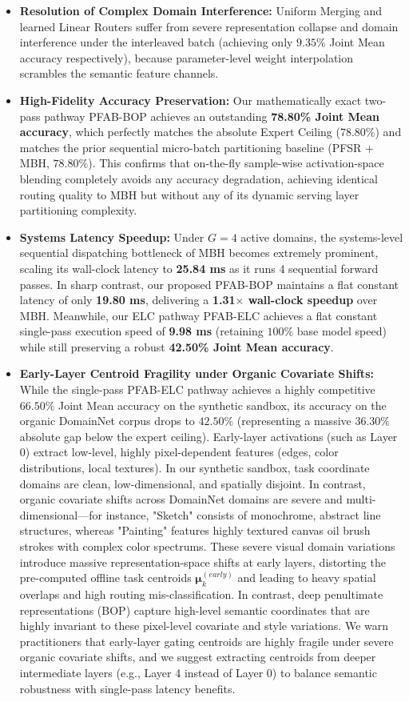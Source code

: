 \begin{itemize}
  \item \textbf{Resolution of Complex Domain Interference:} Uniform Merging and learned Linear Routers suffer from severe representation collapse and domain interference under the interleaved batch (achieving only $9.35\%$ Joint Mean accuracy respectively), because parameter-level weight interpolation scrambles the semantic feature channels.
  \item \textbf{High-Fidelity Accuracy Preservation:} Our mathematically exact two-pass pathway \textsc{PFAB-BOP} achieves an outstanding \textbf{78.80\% Joint Mean accuracy}, which perfectly matches the absolute Expert Ceiling ($78.80\%$) and matches the prior sequential micro-batch partitioning baseline (\textsc{PFSR} + \textsc{MBH}, $78.80\%$). This confirms that on-the-fly sample-wise activation-space blending completely avoids any accuracy degradation, achieving identical routing quality to MBH but without any of its dynamic serving layer partitioning complexity.
  \item \textbf{Systems Latency Speedup:} Under $G=4$ active domains, the systems-level sequential dispatching bottleneck of MBH becomes extremely prominent, scaling its wall-clock latency to \textbf{25.84 ms} as it runs 4 sequential forward passes. In sharp contrast, our proposed \textsc{PFAB-BOP} maintains a flat constant latency of only \textbf{19.80 ms}, delivering a \textbf{1.31$\times$ wall-clock speedup} over MBH. Meanwhile, our ELC pathway \textsc{PFAB-ELC} achieves a flat constant single-pass execution speed of \textbf{9.98 ms} (retaining $100\%$ base model speed) while still preserving a robust \textbf{42.50\% Joint Mean accuracy}.
  \item \textbf{Early-Layer Centroid Fragility under Organic Covariate Shifts:} While the single-pass \textsc{PFAB-ELC} pathway achieves a highly competitive $66.50\%$ Joint Mean accuracy on the synthetic sandbox, its accuracy on the organic DomainNet corpus drops to $42.50\%$ (representing a massive $36.30\%$ absolute gap below the expert ceiling). Early-layer activations (such as Layer 0) extract low-level, highly pixel-dependent features (edges, color distributions, local textures). In our synthetic sandbox, task coordinate domains are clean, low-dimensional, and spatially disjoint. In contrast, organic covariate shifts across DomainNet domains are severe and multi-dimensional—for instance, "Sketch" consists of monochrome, abstract line structures, whereas "Painting" features highly textured canvas oil brush strokes with complex color spectrums. These severe visual domain variations introduce massive representation-space shifts at early layers, distorting the pre-computed offline task centroids $\boldsymbol{\mu}_k^{(early)}$ and leading to heavy spatial overlaps and high routing mis-classification. In contrast, deep penultimate representations (BOP) capture high-level semantic coordinates that are highly invariant to these pixel-level covariate and style variations. We warn practitioners that early-layer gating centroids are highly fragile under severe organic covariate shifts, and we suggest extracting centroids from deeper intermediate layers (e.g., Layer 4 instead of Layer 0) to balance semantic robustness with single-pass latency benefits.

\end{itemize}

